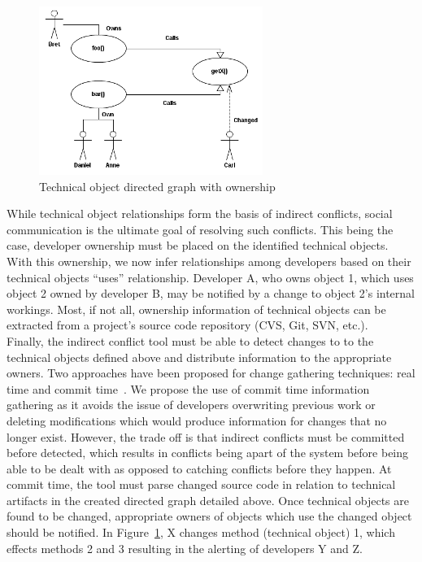\documentclass[conference]{IEEEtran}
\begin{document}
\begin{figure}[t!]
\includegraphics[width=\columnwidth]{images/CallGraph}
\caption{Technical object directed graph with ownership\label{fig:graph}}
\end{figure}

While technical object relationships form the basis of indirect conflicts,
social communication is the ultimate goal of resolving such conflicts.
This being the case, developer ownership must be placed on the 
identified technical objects. With this ownership, we now infer
relationships among developers based on their technical objects
``uses'' relationship. Developer A, who owns object 1, which uses 
object 2 owned by developer B, may be notified by a change to
object 2's internal workings. Most, if not all, ownership information
of technical objects can be extracted from a project's source code
repository (CVS, Git, SVN, etc.).\\

Finally, the indirect conflict tool must be able to detect changes to
to the technical objects defined above and distribute information 
to the appropriate owners. Two approaches have been 
proposed for change gathering techniques: real time and commit 
time~\cite{Fitzpatrick:2002:SPA}.
We propose the use of commit time
information gathering as it avoids the issue of developers 
overwriting previous work or deleting modifications which would 
produce information for changes that no longer exist. However, the
trade off is that indirect conflicts must be committed before detected,
which results in conflicts being apart of the system before being able
to be dealt with as opposed to catching conflicts before they happen.
At commit time, the tool must parse changed source code in relation
to technical artifacts in the created directed graph detailed above.
Once technical objects are found to be changed, appropriate owners
of objects which use the changed object should be notified.
In Figure~\ref{fig:graph}, X changes method (technical object) 1,
which effects methods 2 and 3 resulting in the alerting of
developers Y and Z.
\end{document}
